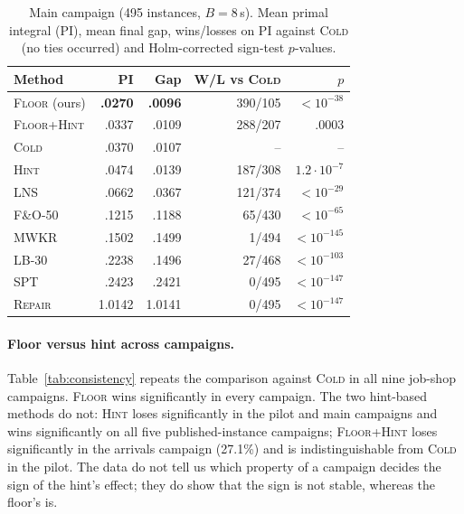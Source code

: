 \documentclass[letterpaper]{article} %
\newcommand{\mcold}{\textsc{Cold}}
\newcommand{\mhint}{\textsc{Hint}}
\newcommand{\mfloor}{\textsc{Floor}}
\newcommand{\mfh}{\textsc{Floor+Hint}}
\newcommand{\mrep}{\textsc{Repair}}
\newcommand{\mlns}{\textsc{LNS}}
\newcommand{\mfo}{\textsc{F\&O-50}}
\newcommand{\mlb}{\textsc{LB-30}}
\newcommand{\mspt}{\textsc{SPT}}
\newcommand{\mmwkr}{\textsc{MWKR}}
\begin{document}
\begin{table}[t]
\centering
\small
\setlength{\tabcolsep}{4pt}
\begin{tabular}{lrrrr}
\toprule
Method & PI & Gap & W/L vs \mcold & $p$ \\
\midrule
\mfloor{} (ours) & \textbf{.0270} & \textbf{.0096} & 390/105 & $<10^{-38}$ \\
\mfh & .0337 & .0109 & 288/207 & .0003 \\
\mcold & .0370 & .0107 & -- & -- \\
\mhint & .0474 & .0139 & 187/308 & $1.2\cdot10^{-7}$ \\
\mlns & .0662 & .0367 & 121/374 & $<10^{-29}$ \\
\mfo & .1215 & .1188 & 65/430 & $<10^{-65}$ \\
\mmwkr & .1502 & .1499 & 1/494 & $<10^{-145}$ \\
\mlb & .2238 & .1496 & 27/468 & $<10^{-103}$ \\
\mspt & .2423 & .2421 & 0/495 & $<10^{-147}$ \\
\mrep & 1.0142 & 1.0141 & 0/495 & $<10^{-147}$ \\
\bottomrule
\end{tabular}
\caption{Main campaign (495 instances, $B=8$\,s). Mean primal integral (PI), mean final gap, wins/losses on PI against \mcold{} (no ties occurred) and Holm-corrected sign-test $p$-values.}
\label{tab:main}
\end{table}

\paragraph{Floor versus hint across campaigns.} Table~\ref{tab:consistency} repeats the comparison against \mcold{} in all nine job-shop campaigns. \mfloor{} wins significantly in every campaign. The two hint-based methods do not: \mhint{} loses significantly in the pilot and main campaigns and wins significantly on all five published-instance campaigns; \mfh{} loses significantly in the arrivals campaign (27.1\%) and is indistinguishable from \mcold{} in the pilot. The data do not tell us which property of a campaign decides the sign of the hint's effect; they do show that the sign is not stable, whereas the floor's is.
\end{document}
